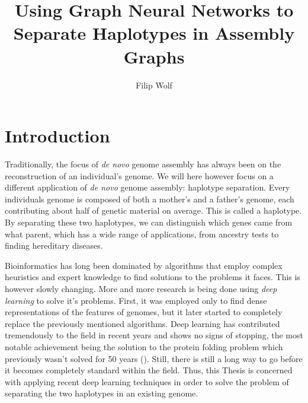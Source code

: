 \documentclass[times, utf8, diplomski, english]{fer_eng}
\begin{document}

\title{Using Graph Neural Networks to Separate Haplotypes in Assembly Graphs}

\author{Filip Wolf}

\maketitle



\zahvala{}

\tableofcontents

\chapter{Introduction}

Traditionally, the focus of \textit{de novo} genome assembly has always been on the reconstruction of an individual's genome. We will here however focus on a different application of \textit{de novo} genome assembly: haplotype separation. Every individuals genome is composed of both a mother's and a father's genome, each contributing about half of genetic material on average. This is called a haplotype. By separating these two haplotypes, we can distinguish which genes came from what parent, which has a wide range of applications, from ancestry tests to finding hereditary diseases.

Bioinformatics has long been dominated by algorithms that employ complex heuristics and expert knowledge to find solutions to the problems it faces. This is however slowly changing. More and more research is being done using \textit{deep learning} to solve it's problems. First, it was employed only to find dense representations of the features of genomes, but it later started to completely replace the previously mentioned algorithms. Deep learning has contributed tremendously to the field in recent years and shows no signs of stopping, the most notable achievement being the solution to the protein folding problem which previously wasn't solved for 50 years (\cite{alphafold}). Still, there is still a long way to go before it becomes completely standard within the field. Thus, this Thesis is concerned with applying recent deep learning techniques in order to solve the problem of separating the two haplotypes in an existing genome.
\end{document}
